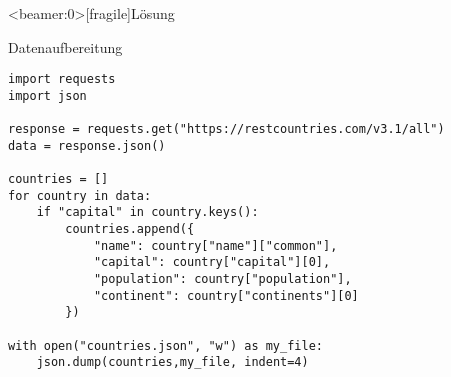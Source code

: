 \begin{frame}<beamer:0>[fragile]{Lösung}
\begin{solutionblock}{Datenaufbereitung}
\begin{verbatim}
import requests
import json 

response = requests.get("https://restcountries.com/v3.1/all")
data = response.json()

countries = []
for country in data: 
    if "capital" in country.keys():
        countries.append({
            "name": country["name"]["common"],
            "capital": country["capital"][0],
            "population": country["population"],
            "continent": country["continents"][0]
        }) 

with open("countries.json", "w") as my_file: 
    json.dump(countries,my_file, indent=4)
\end{verbatim}
\end{solutionblock}
\end{frame}




